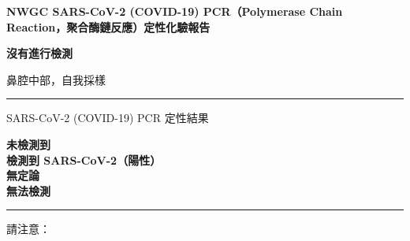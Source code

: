 \documentclass[10pt]{article}
\newcommand{\PageLine}{\rule{\textwidth}{0.25mm}}
\begin{document}
\begin{center}
\Large
\textbf{NWGC SARS-CoV-2 (COVID-19) PCR（Polymerase Chain Reaction，聚合酶鏈反應）定性化驗報告}
\end{center}

\bigskip

\begin{description}[font=\normalfont,align=left,labelwidth=8em]
\item [參與者姓名] \textbf{}
\item [出生日期] \textbf{}
\item [樣本標識符] \textbf{}
\item [樣本提交日期] \textbf{}
\item [結果提供日期]
  \textbf{沒有進行檢測}
  \textbf{}
\item [樣本類型]  鼻腔中部，自我採樣
\end{description}

\PageLine

SARS-CoV-2 (COVID-19) PCR 定性結果

\textbf{未檢測到}\\
\textbf{檢測到 SARS-CoV-2（陽性）}\\
\textbf{無定論}\\
\textbf{無法檢測}\\

\PageLine

請注意：
\end{document}
